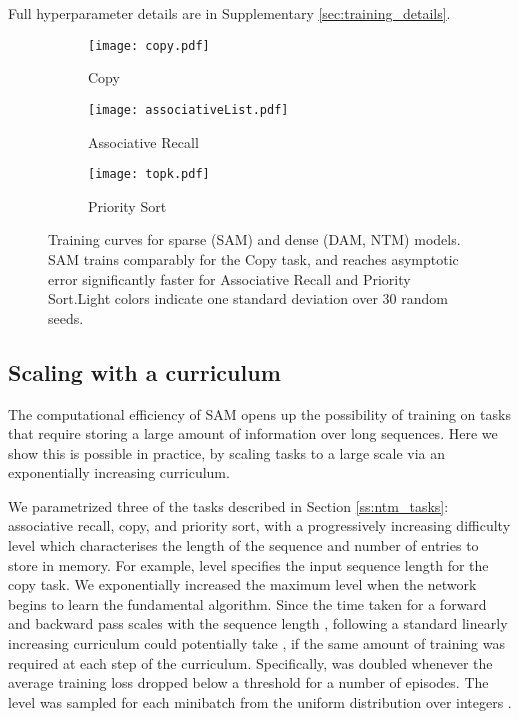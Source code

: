 \documentclass{article}
\begin{document}
Full hyperparameter details are in Supplementary \ref{sec:training_details}.



\begin{figure*}
    \centering
\begin{subfigure}{0.32\textwidth}
    \texttt{[image: copy.pdf]}
    \caption{ \label{sf:ntm_copy} Copy}
    \end{subfigure}
\begin{subfigure}{0.32\textwidth}
    \texttt{[image: associativeList.pdf]}
    \caption{ \label{sf:ntm_associative_recall} Associative Recall}
    \end{subfigure}
\begin{subfigure}{0.32\textwidth}
    \texttt{[image: topk.pdf]}
    \caption{ \label{sf:ntm_topk} Priority Sort}
    \end{subfigure}
\caption{Training curves for sparse (SAM) and dense (DAM, NTM) models. SAM trains comparably for the Copy task, and reaches asymptotic error significantly faster for Associative Recall and Priority Sort.Light colors indicate one standard deviation over 30 random seeds.}
    \label{fig:ntm_tasks}
\end{figure*}


\subsection{Scaling with a curriculum}

The computational efficiency of SAM opens up the possibility of training on tasks that require storing a large amount of information over long sequences. Here we show this is possible in practice, by scaling tasks to a large scale via an exponentially increasing curriculum.

We parametrized three of the tasks described in Section \ref{ss:ntm_tasks}: associative recall, copy, and priority sort, with a progressively increasing difficulty level which characterises the length of the sequence and number of entries to store in memory. For example, level specifies the input sequence length for the copy task.
We exponentially increased the maximum level  when the network begins to learn the fundamental algorithm.
Since the time taken for a forward and backward pass scales  with the sequence length , following a standard linearly increasing curriculum could potentially take , if the same amount of training was required at each step of the curriculum.
Specifically,  was doubled whenever the average training loss dropped below a threshold for a number of episodes. The level was sampled for each minibatch from the uniform distribution over integers .
\end{document}
